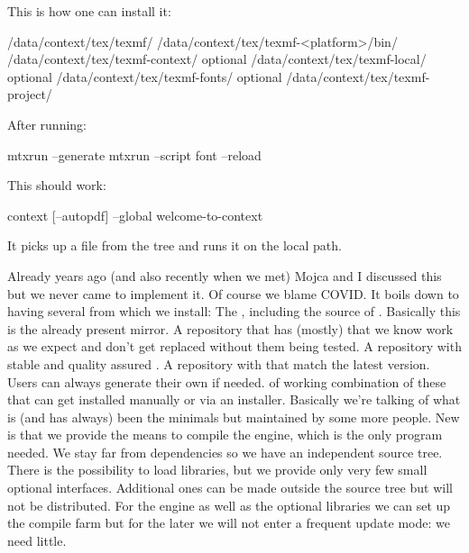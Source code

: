\starttitle[title=Directory structure]

This is how one can install it:

\starttabulate[|l|Tl|]
    \NC {} \NC /data/context/tex/texmf/ \NC \NR
    \NC {} \NC /data/context/tex/texmf-<platform>/bin/ \NC \NR
    \NC {} \NC /data/context/tex/texmf-context/ \NC \NR
    \TB
    \NC optional           \NC /data/context/tex/texmf-local/ \NC \NR
    \NC optional           \NC /data/context/tex/texmf-fonts/ \NC \NR
    \NC optional           \NC /data/context/tex/texmf-project/ \NC \NR
\stoptabulate

After running:

\starttyping
mtxrun --generate
mtxrun --script font --reload
\stoptyping

This should work:

\starttyping
context [--autopdf] --global welcome-to-context
\stoptyping

It picks up a file from the tree and runs it on the local path.

\stoptitle


\starttitle[title=A solution]

\startitemize
    \startitem
        Already years ago (and also recently when we met) Mojca and I discussed
        this but we never came to implement it. Of course we blame COVID.
    \stopitem
    \startitem
        It boils down to having several  from which we install:
        \startitem
            The , including the source of
            \LUAMETATEX. Basically this is the already present mirror.
        \stopitem
        \startitem
            A repository that has (mostly)  that we
            know work as we expect and don't get replaced without them being
            tested.
        \stopitem
        \startitem
            A repository with stable and quality assured .
        \stopitem
        \startitem
            A repository with  that match the latest version.
            Users can always generate their own if needed.
        \stopitem
        \startitem
             of working combination of these that can get
            installed manually or via an installer.
        \stopitem
    \stopitem
    \startitem
        Basically we're talking of what is (and has always) been the minimals
        but maintained by some more people. New is that we provide the means
        to compile the engine, which is the only program needed.
    \stopitem
    \startitem
        We stay far from dependencies so we have an independent source tree.
        There is the possibility to load libraries, but we provide only very few
        small optional interfaces. Additional ones can be made outside the source
        tree but will not be distributed.
    \stopitem
    \startitem
        For the engine as well as the optional libraries we can set up the
        compile farm but for the later we will not enter a frequent update
        mode: we need little.
    \stopitem
\stopitemize


